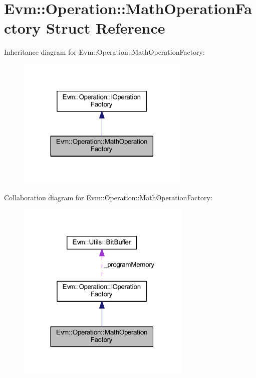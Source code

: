 \hypertarget{struct_evm_1_1_operation_1_1_math_operation_factory}{}\section{Evm\+:\+:Operation\+:\+:Math\+Operation\+Factory Struct Reference}
\label{struct_evm_1_1_operation_1_1_math_operation_factory}


Inheritance diagram for Evm\+:\+:Operation\+:\+:Math\+Operation\+Factory\+:
\nopagebreak
\begin{figure}[H]
\begin{center}
\leavevmode
\includegraphics[width=233pt]{struct_evm_1_1_operation_1_1_math_operation_factory__inherit__graph}
\end{center}
\end{figure}


Collaboration diagram for Evm\+:\+:Operation\+:\+:Math\+Operation\+Factory\+:
\nopagebreak
\begin{figure}[H]
\begin{center}
\leavevmode
\includegraphics[width=236pt]{struct_evm_1_1_operation_1_1_math_operation_factory__coll__graph}
\end{center}
\end{figure}
